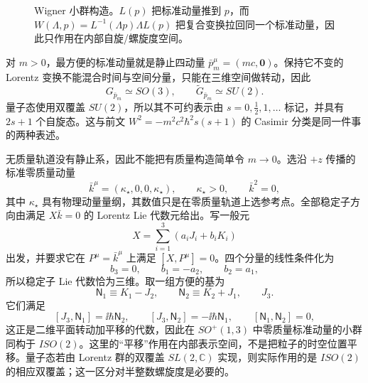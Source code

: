 \begin{figure}[htbp]
 \centering
 
 \caption{Wigner 小群构造。$L(p)$ 把标准动量推到 $p$，而 $W(\Lambda,p)=L^{-1}(\Lambda p)\Lambda L(p)$ 把复合变换拉回同一个标准动量，因此只作用在内部自旋/螺旋度空间。}
 \label{fig:wigner-little-group-dp9}
\end{figure}

对 $m>0$，最方便的标准动量就是静止四动量 $\bar p_m^\mu=(mc,\mathbf0)$。保持它不变的 Lorentz 变换不能混合时间与空间分量，只能在三维空间做转动，因此
\begin{equation}
 {
 G_{\bar p_m}\simeq SO(3),
 \qquad
 \widetilde G_{\bar p_m}\simeq SU(2).}
 \label{eq:wigner-massive-little-group-dp68}
\end{equation}
量子态使用双覆盖 $SU(2)$，所以其不可约表示由 $s=0,\tfrac12,1,\ldots$ 标记，并具有 $2s+1$ 个自旋态。这与前文 $W^2=-m^2c^2\hbar^2s(s+1)$ 的 Casimir 分类是同一件事的两种表述。

无质量轨道没有静止系，因此不能把有质量构造简单令 $m\to0$。选沿 $+z$ 传播的标准零质量动量
\begin{equation}
 \bar k^\mu=(\kappa_\star,0,0,\kappa_\star),
 \qquad \kappa_\star>0,
 \qquad \bar k^2=0,
 \label{eq:wigner-massless-standard-momentum-dp9}
\end{equation}
其中 $\kappa_\star$ 具有物理动量量纲，其数值只是在零质量轨道上选参考点。全部稳定子方向由满足 $X\bar k=0$ 的 Lorentz Lie 代数元给出。写一般元
\begin{equation*}
 X=\sum_{i=1}^3(a_iJ_i+b_iK_i)
\end{equation*}
出发，并要求它在 $P^\mu=\bar k^\mu$ 上满足 $[X,P^\mu]=0$。四个分量的线性条件化为
\begin{equation*}
 b_3=0,
 \qquad
 b_1=-a_2,
 \qquad
 b_2=a_1,
\end{equation*}
所以稳定子 Lie 代数恰为三维。取一组方便的基为
\begin{equation}
 \mathsf N_1\equiv K_1-J_2,
 \qquad
 \mathsf N_2\equiv K_2+J_1,
 \qquad
 J_3.
 \label{eq:wigner-massless-little-group-generators-dp68}
\end{equation}
它们满足
\begin{equation}
 {
 [J_3,\mathsf N_1]=\ii\hbar\mathsf N_2,
 \qquad
 [J_3,\mathsf N_2]=-\ii\hbar\mathsf N_1,
 \qquad
 [\mathsf N_1,\mathsf N_2]=0,}
 \label{eq:wigner-massless-little-group-algebra-dp68}
\end{equation}
这正是二维平面转动加平移的代数，因此在 $SO^+(1,3)$ 中零质量标准动量的小群同构于 $ISO(2)$。这里的“平移”作用在内部表示空间，不是把粒子的时空位置平移。量子态若由 Lorentz 群的双覆盖 $SL(2,\mathbb C)$ 实现，则实际作用的是 $ISO(2)$ 的相应双覆盖；这一区分对半整数螺旋度是必要的。

